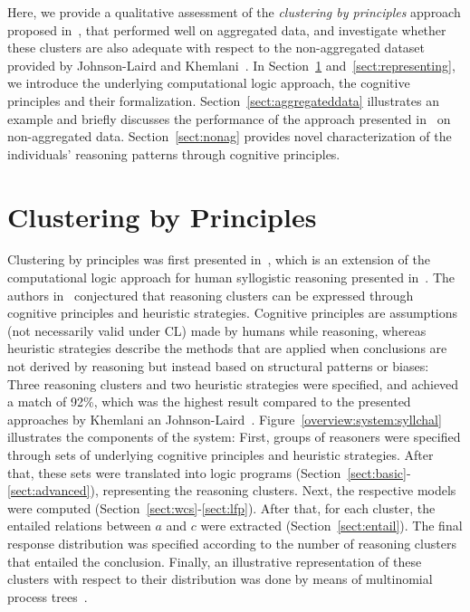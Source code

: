 \documentclass[12pt]{article}
\begin{document}
Here, we provide a qualitative assessment of the \textit{clustering by principles} approach proposed in~\cite{declare:2017},
that performed well on aggregated data, and investigate whether these clusters are also adequate with respect to the non-aggregated dataset provided by Johnson-Laird and Khemlani~\cite{khemlani:2016}.
In Section~\ref{sect:wcsclustering} and~\ref{sect:representing}, we introduce the underlying computational logic approach, the cognitive principles and their formalization. Section~\ref{sect:aggregateddata} illustrates an example and briefly discusses the performance of the approach presented in~\cite{declare:2017} on non-aggregated data.
Section~\ref{sect:nonag} provides novel characterization of the individuals' reasoning patterns through cognitive principles.

\section{Clustering by Principles} \label{sect:wcsclustering}

Clustering by principles was first presented in~\cite{declare:2017}, which is an extension of
the computational logic approach for human syllogistic reasoning presented in~\cite{cogsci:2017}.
The authors in~\cite{declare:2017} conjectured that reasoning clusters can be expressed through cognitive principles and heuristic strategies. Cognitive principles are assumptions (not necessarily valid under CL) made by humans while reasoning, 
whereas heuristic strategies describe the methods that are applied when conclusions are not derived by reasoning but instead based on structural patterns or {biases}: Three reasoning clusters and two heuristic strategies were specified, and achieved a match of 92\;\%, which was the highest result compared to the presented approaches by Khemlani an Johnson-Laird~\cite{khemlani:2012}.
Figure~\ref{overview:system:syllchal} illustrates the components of the system:
First, groups of reasoners were specified through sets of underlying cognitive principles and heuristic strategies.
After that, these sets were translated into logic programs (Section~\ref{sect:basic}-\ref{sect:advanced}), representing the reasoning clusters.
Next, the respective models were computed (Section~\ref{sect:wcs}-\ref{sect:lfp}).
After that, for each cluster, the entailed relations between $a$ and $c$ were extracted (Section~\ref{sect:entail}). 
 The final response distribution was specified according to the number of reasoning clusters 
that entailed the conclusion.
Finally, an illustrative representation of these clusters with respect to their distribution was done by means of multinomial process trees~\cite{Riefer1988}.
\end{document}
